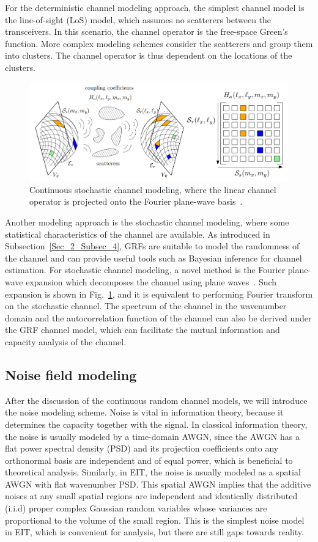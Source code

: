 \documentclass[journal,twocolumn]{IEEEtran}
\begin{document}
For the deterministic channel modeling approach, the simplest channel model is the line-of-sight (LoS) model, which assumes no scatterers between the transceivers. In this scenario, the channel operator is the free-space Green's function. More complex modeling schemes consider the scatterers and group them into clusters. The channel operator is thus dependent on the locations of the clusters.

\begin{figure}
	\centering 
	\includegraphics[width=\linewidth]{figures/random_channel.png} 
	\caption{Continuous stochastic channel modeling, where the linear channel operator is projected onto the Fourier plane-wave basis~\cite{marzetta2022fourier}.} 
	\label{fig:marzetta}
\end{figure}
Another modeling approach is the stochastic channel modeling, where some statistical characteristics of the channel are available. As introduced in Subsection~\ref{Sec_2_Subsec_4}, GRFs are suitable to model the randomness of the channel and can provide useful tools such as Bayesian inference for channel estimation. For stochastic channel modeling, a novel method is the Fourier plane-wave expansion which decomposes the channel using plane waves~\cite{marzetta2022fourier}. Such expansion is shown in Fig.~\ref{fig:marzetta}, and it is equivalent to performing Fourier transform on the stochastic channel. The spectrum of the channel in the wavenumber domain and the autocorrelation function of the channel can also be derived under the GRF channel model, which can facilitate the mutual information and capacity analysis of the channel.

\subsection{Noise field modeling}
After the discussion of the continuous random channel models, we will introduce the noise modeling scheme. 
Noise is vital in information theory, because it determines the capacity together with the signal. 
In classical information theory, the noise is usually modeled by a time-domain AWGN, since the AWGN has a flat power spectral density (PSD) and its projection coefficients onto any orthonormal basis are independent and of equal power, which is beneficial to theoretical analysis. 
Similarly, in EIT, the noise is usually modeled as a spatial AWGN with flat wavenumber PSD. This spatial AWGN implies that the additive noises at any small spatial regions are independent and identically distributed (i.i.d) proper complex Gaussian random variables whose variances are proportional to the volume of the small region. This is the simplest noise model in EIT, which is convenient for analysis, but there are still gaps towards reality. 
\end{document}
